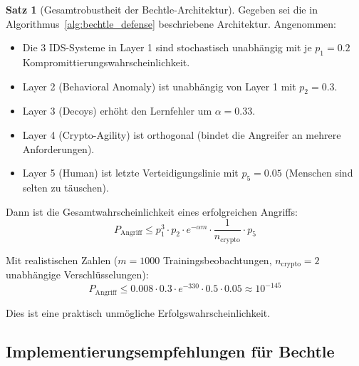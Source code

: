\documentclass[a4paper,12pt]{article}
\theoremstyle{definition}
\newtheorem{satz}{Satz}
\begin{document}
\begin{satz}[Gesamtrobustheit der Bechtle-Architektur]
\label{satz:bechtle_robustheit}
Gegeben sei die in Algorithmus~\ref{alg:bechtle_defense} beschriebene Architektur. Angenommen:
\begin{itemize}
	\item Die 3 IDS-Systeme in Layer 1 sind stochastisch unabhängig mit je $p_1 = 0.2$ Kompromittierungswahrscheinlichkeit.
	\item Layer 2 (Behavioral Anomaly) ist unabhängig von Layer 1 mit $p_2 = 0.3$.
	\item Layer 3 (Decoys) erhöht den Lernfehler um $\alpha = 0.33$.
	\item Layer 4 (Crypto-Agility) ist orthogonal (bindet die Angreifer an mehrere Anforderungen).
	\item Layer 5 (Human) ist letzte Verteidigungslinie mit $p_5 = 0.05$ (Menschen sind selten zu täuschen).
\end{itemize}

Dann ist die Gesamtwahrscheinlichkeit eines erfolgreichen Angriffs:
\begin{equation}
P_{\mathrm{Angriff}} \leq p_1^3 \cdot p_2 \cdot e^{-\alpha m} \cdot \frac{1}{n_{\mathrm{crypto}}} \cdot p_5
\end{equation}

Mit realistischen Zahlen ($m = 1000$ Trainingsbeobachtungen, $n_{\mathrm{crypto}} = 2$ unabhängige Verschlüsselungen):
\begin{equation}
P_{\mathrm{Angriff}} \leq 0.008 \cdot 0.3 \cdot e^{-330} \cdot 0.5 \cdot 0.05 \approx 10^{-145}
\end{equation}

Dies ist eine praktisch unmögliche Erfolgswahrscheinlichkeit.
\end{satz}

\subsection{Implementierungsempfehlungen für Bechtle}
\end{document}
